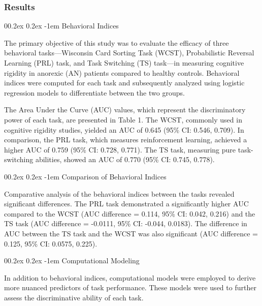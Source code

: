 \documentclass[
  man]{apa6}
\makeatletter
\let\oldparagraph\paragraph
\renewcommand{\paragraph}{
    \@ifstar
      \xxxParagraphStar
      \xxxParagraphNoStar
  }
\newcommand{\xxxParagraphStar}[1]{\oldparagraph*{#1}\mbox{}}
\newcommand{\xxxParagraphNoStar}[1]{\oldparagraph{#1}\mbox{}}
\renewcommand{\paragraph}{\@startsection{paragraph}{4}{\parindent}%
  {0\baselineskip \@plus 0.2ex \@minus 0.2ex}%
  {-1em}%
  {\normalfont\normalsize\bfseries\itshape\typesectitle}}
\makeatother
\begin{document}
\subsubsection{Results}\label{results-1}

\paragraph{Behavioral Indices}\label{behavioral-indices}

The primary objective of this study was to evaluate the efficacy of three behavioral tasks---Wisconsin Card Sorting Task (WCST), Probabilistic Reversal Learning (PRL) task, and Task Switching (TS) task---in measuring cognitive rigidity in anorexic (AN) patients compared to healthy controls. Behavioral indices were computed for each task and subsequently analyzed using logistic regression models to differentiate between the two groups.

The Area Under the Curve (AUC) values, which represent the discriminatory power of each task, are presented in Table 1. The WCST, commonly used in cognitive rigidity studies, yielded an AUC of 0.645 (95\% CI: 0.546, 0.709). In comparison, the PRL task, which measures reinforcement learning, achieved a higher AUC of 0.759 (95\% CI: 0.728, 0.771). The TS task, measuring pure task-switching abilities, showed an AUC of 0.770 (95\% CI: 0.745, 0.778).

\paragraph{Comparison of Behavioral Indices}\label{comparison-of-behavioral-indices}

Comparative analysis of the behavioral indices between the tasks revealed significant differences. The PRL task demonstrated a significantly higher AUC compared to the WCST (AUC difference = 0.114, 95\% CI: 0.042, 0.216) and the TS task (AUC difference = -0.0111, 95\% CI: -0.044, 0.0183). The difference in AUC between the TS task and the WCST was also significant (AUC difference = 0.125, 95\% CI: 0.0575, 0.225).

\paragraph{Computational Modeling}\label{computational-modeling-2}

In addition to behavioral indices, computational models were employed to derive more nuanced predictors of task performance. These models were used to further assess the discriminative ability of each task.
\end{document}
